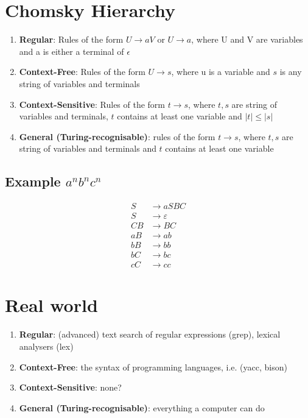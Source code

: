 \documentclass{article}[18pt]
\begin{document}
\section{Chomsky Hierarchy}
\begin{enumerate}
	\item \textbf{Regular}: Rules of the form $U\rightarrow aV$ or $U\rightarrow a$, where U and V are variables and a is either a terminal of $\epsilon$
	\item \textbf{Context-Free}: Rules of the form $U\rightarrow s$, where u is a variable and $s$ is any string of variables and terminals
	\item \textbf{Context-Sensitive}: Rules of the form $t\rightarrow s$, where $t,s $ are string of variables and terminals, $t$ contains at least one variable and $|t|\leqslant |s|$
	\item \textbf{General (Turing-recognisable)}: rules of the form $t\rightarrow s$, where $t, s$ are string of variables and terminals and $t$ contains at least one variable
\end{enumerate}
\subsection{Example $a^nb^nc^n$}
\[
\begin{aligned} S & \rightarrow a S B C \\ S & \rightarrow \varepsilon \\ C B & \rightarrow B C \\ a B & \rightarrow a b \\ b B & \rightarrow b b \\ b C & \rightarrow b c \\ c C & \rightarrow c c \end{aligned}
\]
\section{Real world}
\begin{enumerate}
	\item \textbf{Regular}: (advanced) text search of regular expressions (grep), lexical analysers (lex)
	\item \textbf{Context-Free}: the syntax of programming languages, i.e. (yacc, bison)
	\item \textbf{Context-Sensitive}: none?
	\item \textbf{General (Turing-recognisable)}: everything a computer can do
\end{enumerate}
\end{document}
